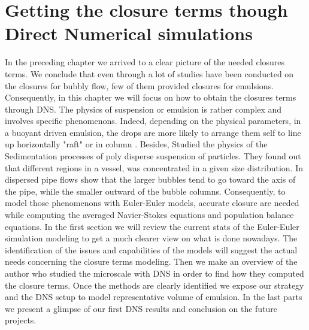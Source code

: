 \chapter{Getting the closure terms though Direct Numerical simulations}
\label{chap:DNS}

In the preceding chapter we arrived to a clear picture of the needed closures terms.
We conclude that even through a lot of studies have been conducted on the closures for bubbly flow, few of them provided closures for emulsions.
Consequently, in this chapter we will focus on how to obtain the closures terms through DNS. 
The physics of suspension or emulsion is rather complex and involves specific phenomenons.
Indeed, depending on the physical parameters, in a buoyant driven emulsion, the drops are more likely to arrange them self to line up horizontally "raft" or in column \citep{tryggvason2011direct} \citep{guazzelli2011}. 
Besides, \citet{davis1985sedimentation} Studied the physics of the Sedimentation processes of poly disperse suspension of particles. 
They found out that different regions in a vessel, was concentrated in a given size distribution.
In dispersed pipe flows \citet{morel2010comparison} show that the larger bubbles tend to go toward the axis of the pipe, while the smaller outward of the bubble columns.
Consequently, to model those phenomenons with Euler-Euler models, accurate closure are needed while computing the averaged Navier-Stokes equations and population balance equations.
In the first section we will review the current stats of the Euler-Euler simulation modeling to get a much clearer view on what is done nowadays.
The identification of the issues and capabilities of the models will suggest the actual needs concerning the closure terms modeling.
Then we make an overview of the author who studied the microscale with DNS in order to find how they computed the closure terms.
Once the methods are clearly identified we expose our strategy and the DNS setup to model representative volume of emulsion. 
In the last parts we present a glimpse of our first DNS results and conclusion on the future projects. 

